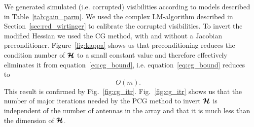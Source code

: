 \documentclass[useAMS,usenatbib]{mn2e}
\newcommand{\bmH}{\bmath{\mathcal{H}}}
\begin{document}
We generated simulated (i.e. corrupted) visibilities according to models described in Table~\ref{tab:gain_parm}. 
%
We used the complex LM-algorithm described in Section~\ref{sec:red_wirtinger} to calibrate the corrupted visibilities. To invert the modified
Hessian we used the CG method, with and without a Jacobian preconditioner. 
Figure~\ref{fig:kappa} shows us that preconditioning reduces the condition number of $\bmH$ to a small constant value and therefore effectively eliminates
it from equation~\ref{eq:cg_bound}, i.e. equation~\ref{eq:cg_bound} reduces to
\begin{equation}
\label{eq:cg_bound2}
O(m). 
\end{equation}
This result is confirmed by Fig.~\ref{fig:cg_itr}. Fig.~\ref{fig:cg_itr} 
shows us that the number of major iterations needed by the PCG method to invert 
$\bmH$ is independent of the number of antennas in the array and that it is much less than the 
dimension of $\bmH$. 
\end{document}
